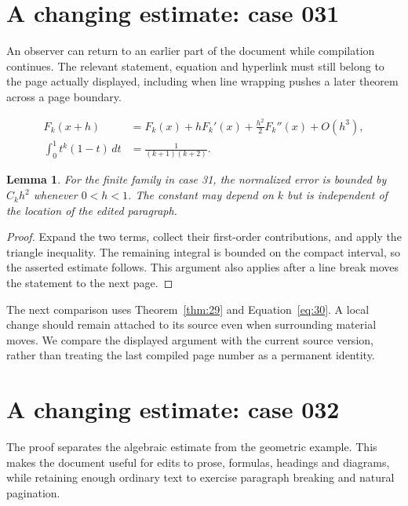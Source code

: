 \documentclass[a4paper,10pt]{article}
\newtheorem{lemma}[theorem]{Lemma}
\begin{document}
\lipsum[23]

\section{A changing estimate: case 031}\label{unit:30}
An observer can return to an earlier part of the document while compilation continues. The relevant statement, equation and hyperlink must still belong to the page actually displayed, including when line wrapping pushes a later theorem across a page boundary.

\lipsum[1-2]
\begin{align}\label{eq:30}
 F_k(x+h)&=F_k(x)+hF_k'(x)+\frac{h^2}{2}F_k''(x)+O(h^3),\\
 \int_0^1 t^k(1-t)\,dt&=\frac{1}{(k+1)(k+2)}.
\end{align}
\begin{lemma}\label{thm:30}
For the finite family in case 31, the normalized error is bounded by $C_k h^2$ whenever $0<h<1$. The constant may depend on $k$ but is independent of the location of the edited paragraph.
\end{lemma}
\begin{proof}
Expand the two terms, collect their first-order contributions, and apply the
triangle inequality. The remaining integral is bounded on the compact interval,
so the asserted estimate follows. This argument also applies after a line break
moves the statement to the next page.
\end{proof}
The next comparison uses Theorem~\ref{thm:29} and Equation~\ref{eq:30}. A local change should remain attached to its source even when surrounding material moves. We compare the displayed argument with the current source version, rather than treating the last compiled page number as a permanent identity.

\lipsum[3]

\section{A changing estimate: case 032}\label{unit:31}
The proof separates the algebraic estimate from the geometric example. This makes the document useful for edits to prose, formulas, headings and diagrams, while retaining enough ordinary text to exercise paragraph breaking and natural pagination.
\end{document}
